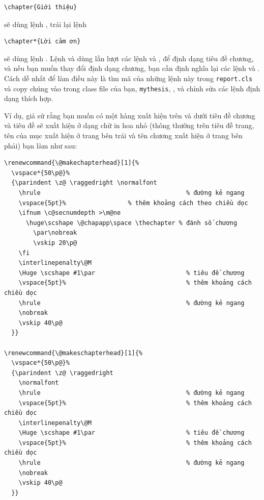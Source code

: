 \documentclass[a4paper]{report}
\begin{document}
\begin{verbatim}
\chapter{Giới thiệu}
\end{verbatim}
sẽ dùng lệnh , trái lại lệnh

\begin{verbatim}
\chapter*{Lời cảm ơn}
\end{verbatim}
sẽ dùng lệnh .
Lệnh  và  dùng  lần lượt các lệnh  và , để định dạng tiêu đề chương, và nếu bạn muốn thay đổi định dạng chương, bạn cần định nghĩa lại  các lệnh 
và .  Cách dễ nhất để làm điều này là tìm mã  của những lệnh này trong \texttt{report.cls}  và copy chúng vào  trong class file của bạn, \texttt{mythesis}, ,  và chỉnh sửa các lệnh định dạng thích hợp.

Ví dụ, giả sử rằng bạn muốn có một hàng xuất hiện trên và dưới tiêu đề chương và tiêu đề sẽ xuất hiện ở dạng chữ in hoa nhỏ (thông thường trên tiêu đề trang, tên của mục xuất hiện ở trang bên trái và tên chương xuất hiện ở trang bên phải) bạn làm như sau:

\begin{verbatim}
\renewcommand{\@makechapterhead}[1]{%
  \vspace*{50\p@}%
  {\parindent \z@ \raggedright \normalfont
    \hrule                                        % đường kẻ ngang
    \vspace{5pt}%                 % thêm khoảng cách theo chiều dọc
    \ifnum \c@secnumdepth >\m@ne
      \huge\scshape \@chapapp\space \thechapter % đánh số chương
        \par\nobreak
        \vskip 20\p@
    \fi
    \interlinepenalty\@M
    \Huge \scshape #1\par                         % tiêu đề chương
    \vspace{5pt}%                                 % thêm khoảng cách chiều dọc
    \hrule                                        % đường kẻ ngang
    \nobreak
    \vskip 40\p@
  }}

\renewcommand{\@makeschapterhead}[1]{%
  \vspace*{50\p@}%
  {\parindent \z@ \raggedright
    \normalfont
    \hrule                                        % đường kẻ ngang 
    \vspace{5pt}%                                 % thêm khoảng cách chiều dọc
    \interlinepenalty\@M
    \Huge \scshape #1\par                         % tiêu đề chương
    \vspace{5pt}%                                 % thêm khoảng cách chiều dọc
    \hrule                                        % đường kẻ ngang 
    \nobreak
    \vskip 40\p@
  }}
\end{verbatim}
\end{document}
